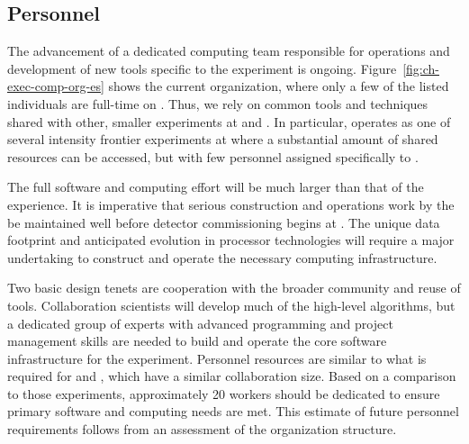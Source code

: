 \begin{dunetable}
\end{dunetable}

\subsection{Personnel}
\label{sec:exec-comp-gov-personnel}

The advancement of a dedicated  computing team responsible for operations and development of new tools specific to the  experiment is ongoing. %
Figure~\ref{fig:ch-exec-comp-org-es} shows the current  organization, where %
only a few of the listed individuals are full-time on .  Thus, we rely on common tools and techniques shared with other, smaller experiments at  and . In particular,  operates as one of several intensity frontier experiments at  where a substantial amount of shared resources can be accessed, but with few personnel assigned specifically to .  %

The full  software and computing effort will be much larger than that of the  experience. It is imperative that serious construction and operations work by the  be maintained well before detector commissioning begins at . %
The unique  data footprint and anticipated evolution in processor technologies will require a major undertaking to construct and operate the necessary computing infrastructure. %


Two basic design tenets are cooperation with the broader community and reuse of tools. Collaboration scientists will develop much of the high-level algorithms, but a dedicated group of experts with advanced programming and project management skills are needed to build and operate the core software infrastructure for the experiment. %
Personnel resources are similar to what is required for  and , which have a similar collaboration size.  Based on a comparison to those experiments, approximately 20  workers should be dedicated to ensure primary  software and computing needs are met. %
This estimate of future personnel requirements follows from an assessment of the  organization structure.

